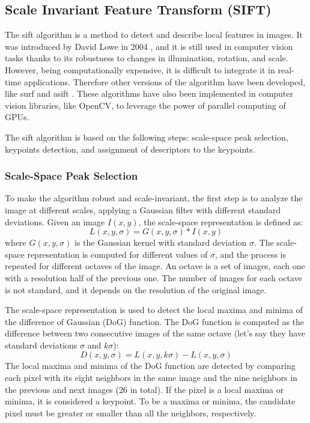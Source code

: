 \subsection{Scale Invariant Feature Transform (SIFT)}
The \ac{sift} algorithm is a method to detect and describe local features in 
images. It was introduced by David Lowe in 2004 \cite{lowe_sift}, and it is 
still used in computer vision tasks thanks to its robustness to changes in 
illumination, rotation, and scale. However, being computationally expensive, 
it is difficult to integrate it in real-time applications. Therefore other 
versions of the algorithm have been developed, like \ac{surf} \cite{surf} and
\ac{asift} \cite{asift}. These algorithms have also been implemented in 
computer vision libraries, like OpenCV, to leverage the power of parallel 
computing of GPUs.

The \ac{sift} algorithm is based on the following steps: scale-space peak
selection, keypoints detection, and assignment of descriptors to the keypoints.

\subsubsection{Scale-Space Peak Selection}
To make the algorithm robust and scale-invariant, the first step is to analyze 
the image at different scales, applying a Gaussian filter with different 
standard deviations. Given an image $I(x, y)$, the scale-space representation 
is defined as: 
\begin{equation}
    L(x, y, \sigma) = G(x, y, \sigma) * I(x, y)
    \label{eq:scale_space}
\end{equation}
where $G(x, y, \sigma)$ is the Gaussian kernel with standard deviation $\sigma$.
The scale-space representation is computed for different values of $\sigma$, and 
the process is repeated for different octaves of the image. An octave is 
a set of images, each one with a resolution half of the previous one. The number 
of images for each octave is not standard, and it depends on the resolution 
of the original image.

The scale-space representation is used to detect the local maxima and minima 
of the difference of Gaussian (DoG) function. The DoG function is computed as 
the difference between two consecutive images of the same octave (let's say 
they have standard deviations $\sigma$ and $k\sigma$):
\begin{equation}
    D(x, y, \sigma) = L(x, y, k\sigma) - L(x, y, \sigma)
    \label{eq:dog}
\end{equation}
The local maxima and minima of the DoG function are detected by comparing each 
pixel with its eight neighbors in the same image and the nine neighbors in the 
previous and next images (26 in total). If the pixel is a local maxima or minima, it is 
considered a keypoint. To be a maxima or minima, the candidate pixel must be 
greater or smaller than all the neighbors, respectively.

